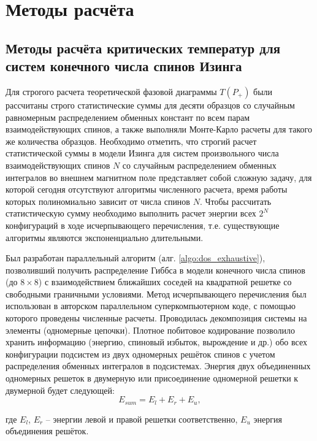 \chapter{Методы расчёта}\label{ch:ch2}

\section{Методы расчёта критических температур для систем конечного числа спинов Изинга} Для строгого расчета теоретической фазовой диаграммы $T(P_+)$ были рассчитаны строго статистические суммы для десяти образцов со случайным равномерным распределением обменных констант по всем парам взаимодействующих спинов, а также выполняли Монте-Карло расчеты для такого же количества образцов. Необходимо отметить, что строгий расчет статистической суммы в модели Изинга для систем произвольного числа взаимодействующих спинов $N$ со случайным распределением обменных интегралов во внешнем магнитном поле представляет собой сложную задачу, для которой сегодня отсутствуют алгоритмы численного расчета, время работы которых полиномиально зависит от числа спинов $N$. Чтобы рассчитать статистическую сумму необходимо выполнить расчет энергии всех $2^N$ конфигураций в ходе исчерпывающего перечисления, т.е. существующие алгоритмы являются экспоненциально длительными.

Был разработан параллельный алгоритм (алг. \ref{algo:dos_exhaustive}), позволивший получить распределение Гиббса в модели конечного числа спинов (до $8\times8$)  с взаимодействием ближайших соседей на квадратной решетке со свободными граничными условиями. Метод исчерпывающего перечисления был использован в авторском параллельном суперкомпьютерном коде, с помощью которого проведены численные расчеты. Проводилась декомпозиция системы на элементы (одномерные цепочки). Плотное побитовое кодирование позволило хранить информацию (энергию, спиновый избыток, вырождение и др.) обо всех конфигурации подсистем из двух одномерных решёток спинов с учетом распределения обменных интегралов в подсистемах.  Энергия двух объединенных одномерных решеток в двумерную или присоединение одномерной решетки к двумерной будет следующей:
\begin{equation}
	E_{sum}  = E_{l}  + E_{r}  + E_{u},
	\label{eq:unification_energy}
\end{equation}

\noindent где $E_{l}$, $E_{r}$ -- энергии левой и правой решетки соответственно, $E_{u}$ энергия объединения решёток. 

